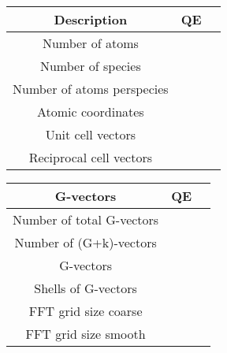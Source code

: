 \documentclass[a4paper,12pt]{article}
\begin{document}
\begin{tabular}{|c|c|c|}
\hline 
Description & QE & \tabularnewline
\hline 
\hline 
Number of atoms &  & \tabularnewline
\hline 
Number of species &  & \tabularnewline
\hline 
Number of atoms perspecies &  & \tabularnewline
\hline 
Atomic coordinates &  & \tabularnewline
\hline 
Unit cell vectors &  & \tabularnewline
\hline 
Reciprocal cell vectors &  & \tabularnewline
\hline 
\end{tabular}

\begin{tabular}{|c|c|c|}
\hline 
G-vectors & QE & \tabularnewline
\hline 
\hline 
Number of total G-vectors &  & \tabularnewline
\hline 
Number of (G+k)-vectors &  & \tabularnewline
\hline 
G-vectors &  & \tabularnewline
\hline 
Shells of G-vectors &  & \tabularnewline
\hline 
FFT grid size coarse &  & \tabularnewline
\hline 
FFT grid size smooth &  & \tabularnewline
\hline 
\end{tabular}
\end{document}
